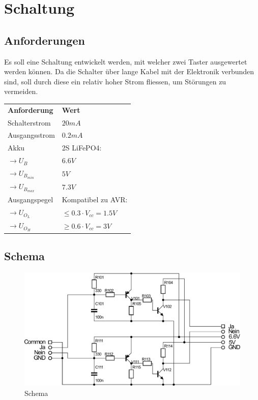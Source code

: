 
\section{Schaltung}

\subsection{Anforderungen}
Es soll eine Schaltung entwickelt werden, mit welcher zwei Taster ausgewertet werden können. Da die Schalter über lange Kabel mit der Elektronik verbunden sind, soll durch diese ein relativ hoher Strom fliessen, um Störungen zu vermeiden. 

\begin{table}[h!]
  \begin{tabular}{@{}ll}
    \textbf{Anforderung}        & \textbf{Wert} \\
    Schalterstrom               & $20 mA$ \\
    Ausgangsstrom               & $0.2 mA$ \\
    Akku                        & 2S LiFePO4: \\
    $\rightarrow U_B$           & $6.6 V$ \\
    $\rightarrow U_{B_{min}}$   & $5 V$ \\
    $\rightarrow U_{B_{max}}$   & $7.3 V$ \\
    Ausgangspegel               & Kompatibel zu AVR: \\
    $\rightarrow U_{O_L}$       & $\leq 0.3 \cdot V_{cc} = 1.5 V$ \\
    $\rightarrow U_{O_H}$       & $\geq 0.6 \cdot V_{cc} = 3 V$ \\
    
  \end{tabular}
\end{table}

\subsection{Schema}
\begin{figure}[h!]
	\centering
	\includegraphics[scale=\schscale]{fig/xlr_pegelwandler_v_1_2_sch.pdf}
	\caption{Schema}
	\label{sch:pegw}
\end{figure}

